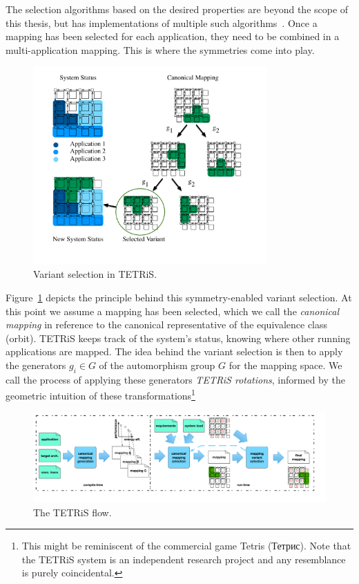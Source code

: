 The selection algorithms based on the desired properties are beyond the scope of this thesis, but \mocasin has implementations of multiple such algorithms~\cite{khasanov_date20}.
Once a mapping has been selected for each application, they need to be combined in a multi-application mapping.
This is where the symmetries come into play. 

\begin{figure}[th]
	\centering
	\includegraphics[width=0.8\textwidth]{figures/Variant_Selection.pdf}
	\caption{Variant selection in \ac{TETRiS}.}
	\label{fig:tetris_variant_selection}
\end{figure}

Figure~\ref{fig:tetris_variant_selection} depicts the principle behind this symmetry-enabled variant selection.
At this point we assume a mapping has been selected, which we call the \emph{canonical mapping} in reference to the canonical representative of the equivalence class (orbit).
\ac{TETRiS} keeps track of the system's status, knowing where other running applications are mapped.
The idea behind the variant selection is then to apply the generators $g_i \in G$ of the automorphism group $G$ for the mapping space. 
We call the process of applying these generators \emph{\ac{TETRiS} rotations}, informed by the geometric intuition of these transformations\footnote{This might be reminiscent of the commercial game Tetris (Тетрис). Note that the \ac{TETRiS} system is an independent research project and any resemblance is purely coincidental.}

\begin{figure}[th]
	\centering
	\includegraphics[width=1.00\textwidth]{figures/tetris_flow.pdf}
	\caption{The \ac{TETRiS} flow.}
	\label{fig:tetris_flow}
\end{figure}

